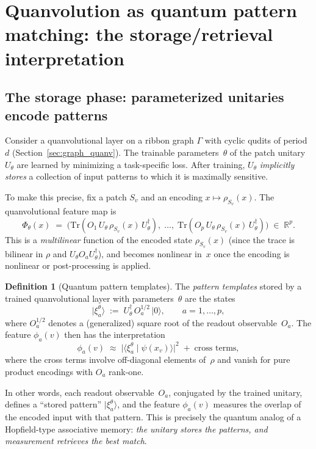 \documentclass[11pt,oneside]{amsbook}
\numberwithin{equation}{section}
\theoremstyle{plain}
\theoremstyle{definition}
\newtheorem{definition}[theorem]{Definition}
\theoremstyle{remark}
\newcommand{\ket}[1]{\lvert #1 \rangle}
\begin{document}
\section{Quanvolution as quantum pattern matching: the storage/retrieval interpretation}
\label{sec:quanv_pattern_matching}

\subsection{The storage phase: parameterized unitaries encode patterns}

Consider a quanvolutional layer on a ribbon graph $\Gamma$ with cyclic qudits of period~$d$
(Section~\ref{sec:graph_quanv}).
The trainable parameters~$\theta$ of the patch unitary $U_\theta$ are learned by minimizing a
task-specific loss.  After training, $U_\theta$ \emph{implicitly stores} a collection of input
patterns to which it is maximally sensitive.

To make this precise, fix a patch $S_v$ and an encoding $x\mapsto\rho_{S_v}(x)$.
The quanvolutional feature map is
\[
  \Phi_\theta(x)
  \;=\;
  \bigl(\mathrm{Tr}(O_1\,U_\theta\,\rho_{S_v}(x)\,U_\theta^\dagger),\;\ldots,\;
         \mathrm{Tr}(O_p\,U_\theta\,\rho_{S_v}(x)\,U_\theta^\dagger)\bigr)
  \;\in\;\mathbb{R}^p.
\]
This is a \emph{multilinear} function of the encoded state $\rho_{S_v}(x)$ (since the trace is
bilinear in $\rho$ and $U_\theta O_a U_\theta^\dagger$), and becomes nonlinear in~$x$ once the
encoding is nonlinear or post-processing is applied.

\begin{definition}[Quantum pattern templates]
\label{def:pattern_templates}
The \emph{pattern templates} stored by a trained quanvolutional layer with parameters~$\theta$
are the states
\[
  \ket{\xi_a^\theta}
  \;:=\;
  U_\theta^\dagger\, O_a^{1/2}\, \ket{0},
  \qquad a=1,\ldots,p,
\]
where $O_a^{1/2}$ denotes a (generalized) square root of the readout observable~$O_a$.
The feature $\phi_a(v)$ then has the interpretation
\[
  \phi_a(v)
  \;\approx\;
  \bigl|\langle\xi_a^\theta\mid\psi(x_v)\rangle\bigr|^2
  \;+\;\text{cross terms},
\]
where the cross terms involve off-diagonal elements of~$\rho$ and vanish for pure product
encodings with $O_a$ rank-one.
\end{definition}

In other words, each readout observable~$O_a$, conjugated by the trained unitary, defines a
``stored pattern'' $\ket{\xi_a^\theta}$, and the feature $\phi_a(v)$ measures the overlap of the
encoded input with that pattern.  This is precisely the quantum analog of a Hopfield-type
associative memory: \emph{the unitary stores the patterns, and measurement retrieves the best
match}.
\end{document}
